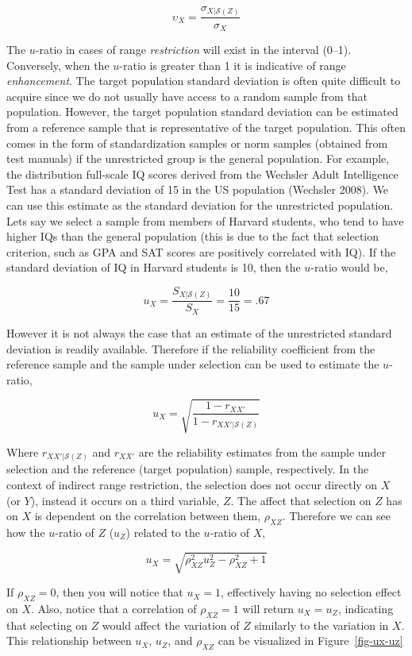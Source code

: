 \documentclass[
  letterpaper,
  DIV=11,
  numbers=noendperiod]{scrreprt}
\begin{document}
\[
\upsilon_X = \frac{\sigma_{X|\mathcal{S}(Z)}}{\sigma_{X}}
\]

The \(u\)-ratio in cases of range \emph{restriction} will exist in the
interval (0--1). Conversely, when the \(u\)-ratio is greater than 1 it
is indicative of range \emph{enhancement}. The target population
standard deviation is often quite difficult to acquire since we do not
usually have access to a random sample from that population. However,
the target population standard deviation can be estimated from a
reference sample that is representative of the target population. This
often comes in the form of standardization samples or norm samples
(obtained from test manuals) if the unrestricted group is the general
population. For example, the distribution full-scale IQ scores derived
from the Wechsler Adult Intelligence Test has a standard deviation of 15
in the US population (Wechsler 2008). We can use this estimate as the
standard deviation for the unrestricted population. Lets say we select a
sample from members of Harvard students, who tend to have higher IQs
than the general population (this is due to the fact that selection
criterion, such as GPA and SAT scores are positively correlated with
IQ). If the standard deviation of IQ in Harvard students is 10, then the
\(u\)-ratio would be,

\[
u_X =  \frac{S_{X|\mathcal{S}(Z)}}{S_X} = \frac{10}{15}= .67
\]

However it is not always the case that an estimate of the unrestricted
standard deviation is readily available. Therefore if the reliability
coefficient from the reference sample and the sample under selection can
be used to estimate the \(u\)-ratio,

\[
u_X = \sqrt{\frac{1-r_{XX'}}{1-r_{XX'|\mathcal{S}(Z)}}}
\]

Where \(r_{XX'|\mathcal{S}(Z)}\) and \(r_{XX'}\) are the reliability
estimates from the sample under selection and the reference (target
population) sample, respectively. In the context of indirect range
restriction, the selection does not occur directly on \(X\) (or \(Y\)),
instead it occurs on a third variable, \(Z\). The affect that selection
on \(Z\) has on \(X\) is dependent on the correlation between them,
\(\rho_{XZ}\). Therefore we can see how the \(u\)-ratio of \(Z\)
(\(u_Z\)) related to the \(u\)-ratio of \(X\),

\[
u_X = \sqrt{\rho_{XZ}^2u_Z^2 -\rho_{XZ}^2 + 1 }
\]

If \(\rho_{XZ}=0\), then you will notice that \(u_X=1\), effectively
having no selection effect on \(X\). Also, notice that a correlation of
\(\rho_{XZ}=1\) will return \(u_X=u_Z\), indicating that selecting on
\(Z\) would affect the variation of \(Z\) similarly to the variation in
\(X\). This relationship between \(u_X\), \(u_Z\), and \(\rho_{XZ}\) can
be visualized in Figure~\ref{fig-ux-uz}
\end{document}
